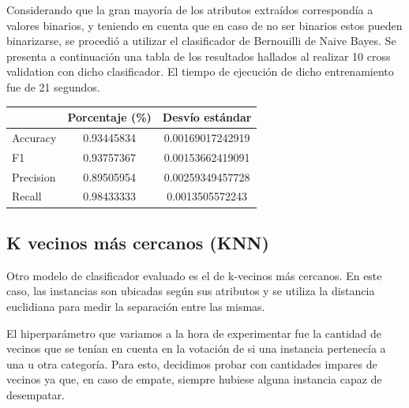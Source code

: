 \documentclass{article}
\begin{document}
Considerando que la gran mayoría de los atributos extraídos correspondía a valores binarios, y teniendo en cuenta que en caso de no ser binarios estos pueden binarizarse, se procedió a utilizar el clasificador de Bernouilli de Naive Bayes. Se presenta a continuación una tabla de los resultados hallados al realizar 10 cross validation con dicho clasificador. El tiempo de ejecución de dicho entrenamiento fue de 21 segundos.



\begin{center}
  \begin{tabular}{| l | c | c |}
    \hline
      & Porcentaje (\%) & Desvío estándar  \\ \hline
    Accuracy & 0.93445834 & 0.00169017242919 \\ \hline
    F1 & 0.93757367 & 0.00153662419091 \\ \hline
    Precision & 0.89505954 & 0.00259349457728 \\ \hline
    Recall & 0.98433333 & 0.0013505572243 \\
    \hline
  \end{tabular}
\end{center}

\subsection{K vecinos más cercanos (KNN)}

Otro modelo de clasificador evaluado es el de k-vecinos más cercanos. En este caso, las instancias son ubicadas según sus atributos y se utiliza la distancia euclidiana para medir la separación entre las mismas. 

El hiperparámetro que variamos a la hora de experimentar fue la cantidad de vecinos que se tenían en cuenta en la votación de si una instancia pertenecía a una u otra categoría. Para esto, decidimos probar con cantidades impares de vecinos ya que, en caso de empate, siempre hubiese alguna instancia capaz de desempatar.
\end{document}
